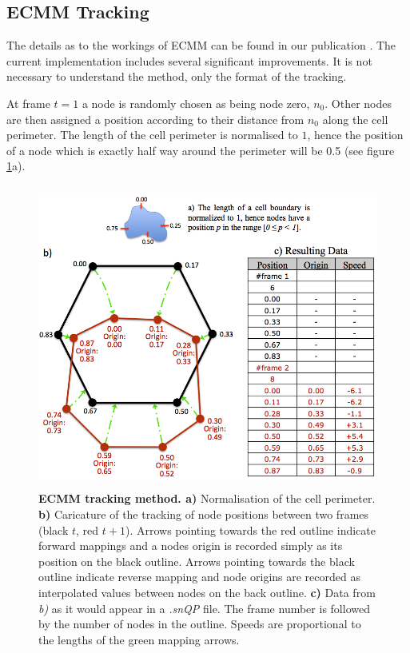 \documentclass[a4paper,12pt]{article}
\begin{document}
\subsection{ECMM Tracking}
\label{ecmmTracking}

The details as to the workings of ECMM can be found in our publication \cite{Tyson2010}.
The current implementation includes several significant improvements.  It is not necessary to understand the method,
only the format of the tracking.

At frame $t=1$ a node is randomly chosen as being node zero, $n_{0}$.  Other nodes are then assigned a position
according to their distance from $n_{0}$ along the cell perimeter.  The length of the cell perimeter 
is normalised to $1$, hence the position of a node which is exactly half way around the perimeter will be 0.5
(see figure \ref{ecmm}a).

\begin{figure}[ht]
   \centering
   \includegraphics[height=10cm]{ecmm.png}
   \caption{\textbf{ECMM tracking method. a)} Normalisation of the cell perimeter. \textbf{b)} Caricature of the tracking of node positions
   between two frames (black $t$, red $t+1$). Arrows pointing towards the red outline indicate forward mappings and a nodes origin is recorded simply
   as its position on the black outline. Arrows pointing towards the black outline indicate reverse mapping and node origins
   are recorded as interpolated values between nodes on the back outline.
    \textbf{c)} Data from \textit{b)} as it would appear in a \textit{.snQP} file. The frame number is followed by the number of nodes in the outline.
    Speeds are proportional to the lengths of the green mapping arrows.}
   \label{ecmm}
\end{figure}
\end{document}
